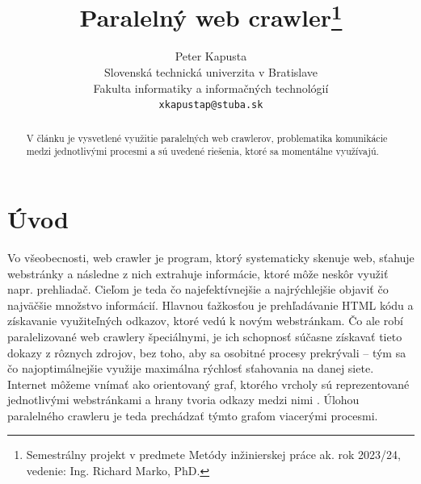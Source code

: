 \documentclass[10pt,twoside,slovak,a4paper]{article}
\title{Paralelný web crawler\thanks{Semestrálny projekt v predmete Metódy inžinierskej práce ak. rok 2023/24, vedenie: Ing. Richard Marko, PhD.}}
\author{Peter Kapusta \\
	\small Slovenská technická univerzita v Bratislave \\
	\small Fakulta informatiky a informačných technológií \\
	\small \texttt{xkapustap@stuba.sk}
}
\begin{document}
\maketitle

\begin{abstract}
V článku je vysvetlené využitie paralelných web crawlerov, problematika komunikácie medzi jednotlivými procesmi a sú uvedené riešenia, ktoré sa momentálne využívajú.
\end{abstract}

\section{Úvod}

Vo všeobecnosti, web crawler je program, ktorý systematicky skenuje web, sťahuje webstránky a následne z nich extrahuje informácie, ktoré môže neskôr využiť napr. prehliadač. Cieľom je teda čo najefektívnejšie a najrýchlejšie objaviť čo najväčšie množstvo informácií. Hlavnou ťažkosťou je prehľadávanie HTML kódu a získavanie využiteľných odkazov, ktoré vedú k novým webstránkam. Čo ale robí paralelizované web crawlery špeciálnymi, je ich schopnosť súčasne získavať tieto dokazy z rôznych zdrojov, bez toho, aby sa osobitné procesy prekrývali – tým sa čo najoptimálnejšie využije maximálna rýchlosť sťahovania na danej siete. Internet môžeme vnímať ako orientovaný graf, ktorého vrcholy sú reprezentované jednotlivými webstránkami a hrany tvoria odkazy medzi nimi \cite{7148493}. Úlohou paralelného crawleru je teda prechádzať týmto grafom viacerými procesmi.

\newpage
\end{document}
